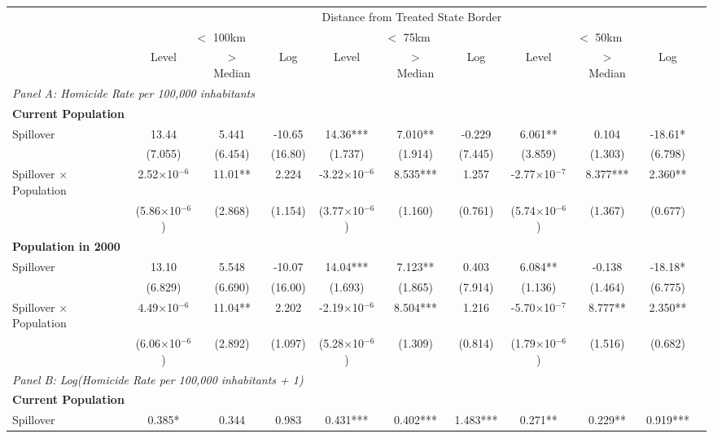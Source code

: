 \documentclass{article}
\begin{document}
\begin{table}[htbp]
\begin{adjustbox}{width=\textwidth}
\begin{tabular}{lcccccccccc}
\toprule
& \multicolumn{9}{c}{Distance from Treated State Border} \\
\cmidrule(lr){2-10}
& \multicolumn{3}{c}{$<$ 100km} & \multicolumn{3}{c}{$<$ 75km} & \multicolumn{3}{c}{$<$ 50km} \\
\cmidrule(lr){2-4} \cmidrule(lr){5-7} \cmidrule(lr){8-10}
& Level & $>$ Median & Log & Level & $>$ Median & Log & Level & $>$ Median & Log \\
\midrule
\multicolumn{10}{l}{\textit{Panel A: Homicide Rate per 100,000 inhabitants}} \\[0.5em]
\multicolumn{10}{l}{\textbf{Current Population}} \\[0.5em]
Spillover & 13.44 & 5.441 & -10.65 & 14.36*** & 7.010** & -0.229 & 6.061** & 0.104 & -18.61* \\
& (7.055) & (6.454) & (16.80) & (1.737) & (1.914) & (7.445) & (3.859) & (1.303) & (6.798) \\[0.5em]
Spillover × Population & 2.52$\times$10$^{-6}$ & 11.01** & 2.224 & -3.22$\times$10$^{-6}$ & 8.535*** & 1.257 & -2.77$\times$10$^{-7}$ & 8.377*** & 2.360** \\
& (5.86$\times$10$^{-6}$) & (2.868) & (1.154) & (3.77$\times$10$^{-6}$) & (1.160) & (0.761) & (5.74$\times$10$^{-6}$) & (1.367) & (0.677) \\[1em]
\multicolumn{10}{l}{\textbf{Population in 2000}} \\[0.5em]
Spillover & 13.10 & 5.548 & -10.07 & 14.04*** & 7.123** & 0.403 & 6.084** & -0.138 & -18.18* \\
& (6.829) & (6.690) & (16.00) & (1.693) & (1.865) & (7.914) & (1.136) & (1.464) & (6.775) \\[0.5em]
Spillover × Population & 4.49$\times$10$^{-6}$ & 11.04** & 2.202 & -2.19$\times$10$^{-6}$ & 8.504*** & 1.216 & -5.70$\times$10$^{-7}$ & 8.777** & 2.350** \\
& (6.06$\times$10$^{-6}$) & (2.892) & (1.097) & (5.28$\times$10$^{-6}$) & (1.309) & (0.814) & (1.79$\times$10$^{-6}$) & (1.516) & (0.682) \\
\midrule
\multicolumn{10}{l}{\textit{Panel B: Log(Homicide Rate per 100,000 inhabitants + 1)}} \\[0.5em]
\multicolumn{10}{l}{\textbf{Current Population}} \\[0.5em]
Spillover & 0.385* & 0.344 & 0.983 & 0.431*** & 0.402*** & 1.483*** & 0.271** & 0.229** & 0.919*** \\

\end{tabular}
\end{adjustbox}
\end{table}
\end{document}
